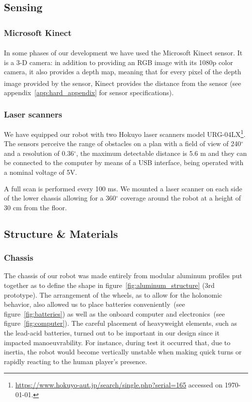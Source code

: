 \begin{figure}[ht]
      \label{fig:evolution}
\end{figure}

\subsection{Sensing}
\subsubsection{Microsoft Kinect\textsuperscript{\textregistered}\label{sec:kinectsec}}
In some phases of our development we have used the Microsoft Kinect\textsuperscript{\textregistered} sensor. It is a 3-D camera: in addition to providing an RGB image with its 1080p color camera, it also provides a depth map,  meaning that for every pixel of the depth image provided by the sensor, Kinect\textsuperscript{\textregistered} provides the distance from the sensor (see appendix~\ref{app:hard_appendix} for sensor specifications). 

\subsubsection{Laser scanners}\label{sec:lasers_hokuyo}
We have equipped our robot with two Hokuyo laser scanners model URG-04LX\footnote{\url{https://www.hokuyo-aut.jp/search/single.php?serial=165} accessed on \today.}. The sensors perceive the range of obstacles on a plan with a field of view of 240$^\circ$ and a resolution of 0.36$^\circ$, the maximum detectable distance is 5.6 m and they can be connected to the computer by means of a USB interface, being operated with a nominal voltage of 5V.

A full scan is performed every 100 ms. We mounted a laser scanner on each side of the lower chassis allowing for a 360$^\circ$ coverage around the robot at a height of 30 cm from the floor.

\subsection{Structure \& Materials}
\subsubsection{Chassis}
The chassis of our robot was made entirely from modular aluminum profiles put together as to define the shape in figure~\ref{fig:aluminum_structure} (3rd prototype). The arrangement of the wheels, as to allow for the holonomic behavior, also allowed us to place batteries conveniently~(see figure~\ref{fig:batteries}) as well as the onboard computer and electronics~(see figure~\ref{fig:computer}). The careful placement of heavyweight elements, such as the lead-acid batteries, turned out to be important in our design since it impacted manoeuvrability. For instance, during test it occurred that, due to inertia, the robot would become vertically unstable when making quick turns or rapidly reacting to the human player's presence. 

